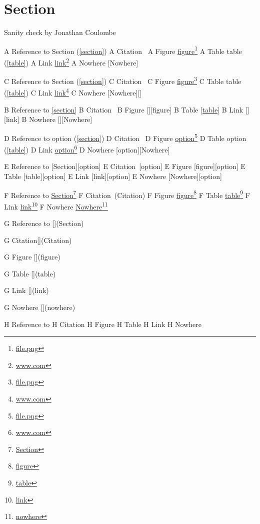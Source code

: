 
\def\mytitle{MultiMarkdown Sanity Test}


\part{Section}
\label{section}

Sanity check by Jonathan Coulombe

A Reference to Section (\autoref{section})
A Citation~\citep{Citation}
A Figure \href{file.png}{figure}\footnote{\href{file.png}{file.png}}
A Table table (\autoref{table})
A Link \href{www.com}{link}\footnote{\href{www.com}{www.com}}
A Nowhere [Nowhere]

C Reference to Section (\autoref{section})
C Citation~\citep{Citation}
C Figure \href{file.png}{figure}\footnote{\href{file.png}{file.png}}
C Table table (\autoref{table})
C Link \href{www.com}{link}\footnote{\href{www.com}{www.com}}
C Nowhere [Nowhere][]

B Reference to \autoref{section}
B Citation~\citep{Citation}
B Figure [][figure]
B Table \autoref{table}
B Link [][link]
B Nowhere [][Nowhere]

D Reference to option (\autoref{section})
D Citation~\citep[option]{Citation}
D Figure \href{file.png}{option}\footnote{\href{file.png}{file.png}}
D Table option (\autoref{table})
D Link \href{www.com}{option}\footnote{\href{www.com}{www.com}}
D Nowhere [option][Nowhere]

E Reference to [Section][option]
E Citation~\citep{Citation}[option]
E Figure [figure][option]
E Table [table][option]
E Link [link][option]
E Nowhere [Nowhere][option]

F Reference to \href{Section}{Section}\footnote{\href{Section}{Section}}
F Citation~\citep{Citation}(Citation)
F Figure \href{figure}{figure}\footnote{\href{figure}{figure}}
F Table \href{table}{table}\footnote{\href{table}{table}}
F Link \href{link}{link}\footnote{\href{link}{link}}
F Nowhere \href{nowhere}{Nowhere}\footnote{\href{nowhere}{nowhere}}

G Reference to [](Section)

G Citation[](Citation)

G Figure [](figure)

G Table [](table)

G Link [](link)

G Nowhere [](nowhere)

H Reference to \href{#Section}{}
H Citation\href{#Citation}{}
H Figure \href{#figure}{}
H Table \href{#table}{}
H Link \href{#link}{}
H Nowhere \href{#nowhere}{}

